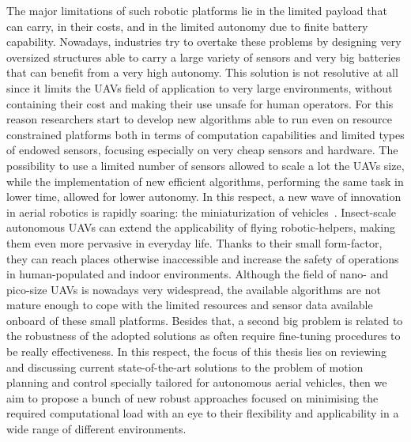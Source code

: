 The major limitations of such robotic platforms lie in the limited payload that can carry, in their costs, and in the limited
autonomy due to finite battery capability. Nowadays, industries try to overtake these problems by designing very oversized
structures able to carry a large variety of sensors and very big batteries that can benefit from a very high autonomy.
This solution is not resolutive at all since it limits the UAVs field of application to very large environments, without containing
their cost and making their use unsafe for human operators.
For this reason researchers start to develop new algorithms able to run even on resource constrained platforms both in terms of
computation capabilities and limited types of endowed sensors, focusing especially on very cheap sensors and hardware.
The possibility to use a limited number of sensors allowed to scale a lot the UAVs size, while the implementation of new efficient
algorithms, performing the same task in lower time, allowed for lower autonomy.
In this respect, a new wave of innovation in aerial robotics is rapidly soaring: the miniaturization of vehicles~\cite{wood2012progress, floreano2015science, graule2016perching}.
Insect-scale autonomous UAVs can extend the applicability of flying robotic-helpers, making them even more pervasive in everyday life.
Thanks to their small form-factor, they can reach places otherwise inaccessible and increase the safety of operations in human-populated and indoor environments.
Although the field of nano- and pico-size UAVs is nowadays very widespread, the available algorithms are not mature enough to cope with
the limited resources and sensor data available onboard of these small platforms.
Besides that, a second big problem is related to the robustness of the adopted solutions as often require fine-tuning procedures to
be really effectiveness.
In this respect, the focus of this thesis lies on reviewing and discussing current state-of-the-art solutions to the problem of motion planning and control
specially tailored for autonomous aerial vehicles, then we aim to propose a bunch of new robust approaches focused on minimising the required
computational load with an eye to their flexibility and applicability in a wide range of different environments.

